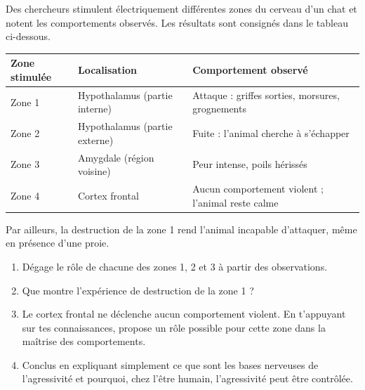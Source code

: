 \documentclass[11pt]{article}
\begin{document}
\begin{exercice}
Des chercheurs stimulent électriquement différentes zones du cerveau d'un chat et notent les comportements observés. Les résultats sont consignés dans le tableau ci-dessous.

\begin{center}
\begin{tabularx}{\linewidth}{|l|X|X|}\hline
\rowcolor{popblueL} \textbf{Zone stimulée} & \textbf{Localisation} & \textbf{Comportement observé} \\ \hline
Zone 1 & Hypothalamus (partie interne) & Attaque : griffes sorties, morsures, grognements \\ \hline
Zone 2 & Hypothalamus (partie externe) & Fuite : l'animal cherche à s'échapper \\ \hline
Zone 3 & Amygdale (région voisine) & Peur intense, poils hérissés \\ \hline
Zone 4 & Cortex frontal & Aucun comportement violent ; l'animal reste calme \\ \hline
\end{tabularx}
\end{center}

Par ailleurs, la destruction de la zone 1 rend l'animal incapable d'attaquer, même en présence d'une proie.

\begin{enumerate}
\item Dégage le rôle de chacune des zones 1, 2 et 3 à partir des observations.
\item Que montre l'expérience de destruction de la zone 1 ?
\item Le cortex frontal ne déclenche aucun comportement violent. En t'appuyant sur tes connaissances, propose un rôle possible pour cette zone dans la maîtrise des comportements.
\item Conclus en expliquant simplement ce que sont les bases nerveuses de l'agressivité et pourquoi, chez l'être humain, l'agressivité peut être contrôlée.
\end{enumerate}
\end{exercice}
\end{document}
